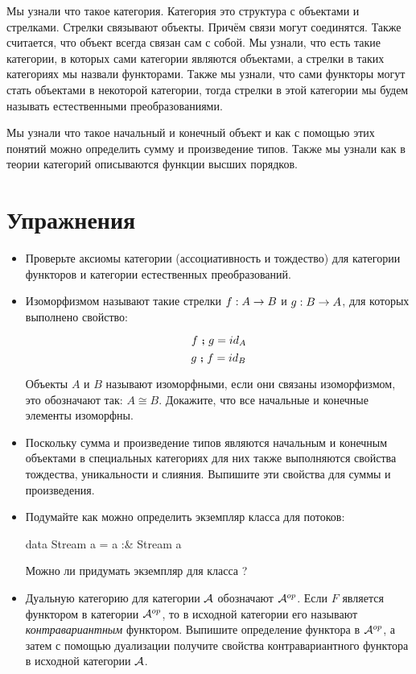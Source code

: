Мы узнали что такое категория. Категория это структура с
объектами и стрелками. Стрелки связывают объекты. 
Причём связи могут соединятся. Также считается, что
объект всегда связан сам с собой. Мы узнали, что 
есть такие категории, в которых сами категории являются
объектами, а стрелки в таких категориях мы назвали функторами.
Также мы узнали, что сами функторы могут стать объектами
в некоторой категории, тогда стрелки в этой категории мы 
будем называть естественными преобразованиями. 

Мы узнали что такое начальный и конечный объект и как
с помощью этих понятий можно определить сумму и произведение
типов. Также мы узнали как в теории категорий описываются
функции высших порядков.

\section{Упражнения}


\begin{itemize}
\item Проверьте аксиомы категории (ассоциативность и тождество)
    для категории функторов и категории естественных преобразований.

\item Изоморфизмом называют такие стрелки $f:A \rightarrow B$ и $g : B \rightarrow A$, для 
    которых выполнено свойство:

    \[ f \footnotesize\textbf{~;~}\normalsize g = id_A \]
    \[ g \footnotesize\textbf{~;~}\normalsize f = id_B \]

    Объекты $A$ и $B$ называют изоморфными, если они связаны
    изоморфизмом, это обозначают так: $A \cong B$. 
    Докажите, что все начальные и конечные элементы 
    изоморфны. 

\item Поскольку сумма и произведение типов являются 
    начальным и конечным объектами в специальных категориях
    для них также выполняются свойства тождества, уникальности и слияния.
    Выпишите эти свойства для суммы и произведения. 

\item Подумайте как можно определить экземпляр класса 
    для потоков:

\begin{code}
data Stream a = a :& Stream a
\end{code}

    Можно ли придумать экземпляр для класса ?

\item Дуальную категорию для категории $\mathcal{A}$ обозначают $\mathcal{A}^{op}$.
    Если $F$ является функтором в категории $\mathcal{A}^{op}$, то
    в исходной категории его называют \emph{контравариантным}
    функтором. Выпишите определение функтора в $\mathcal{A}^{op}$,
    а затем с помощью дуализации получите свойства контравариантного
    функтора в исходной категории $\mathcal{A}$.

\end{itemize}


